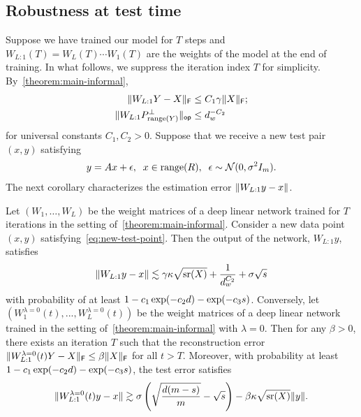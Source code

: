 \subsection{Robustness at test time}
\label{sec:subsec:Robustness at test time}
Suppose we have trained our model for $T$ steps and $W_{L:1}(T) = W_{L}(T) \cdots W_{1}(T)$ are the weights of the model at the end of training.
In what follows, we suppress the iteration index $T$ for simplicity. By~\cref{theorem:main-informal},
\begin{subequations}
\begin{align}
    \lVert W_{L:1}Y-X\rVert_{\mathsf{F}} &\leq
    C_1 \gamma \lVert X\rVert_{\mathsf{F}};
    \label{eq:robust-on} \\
    \lVert W_{L:1} P_{\mathrm{range}(Y)}^{\perp}\rVert_{\mathsf{op}} &\leq
    d_{w}^{-C_2}
    \label{eq:robust-off}
\end{align}
\end{subequations}
for universal constants $C_1, C_2 > 0$. Suppose that we receive a new test pair $(x, y)$ satisfying
\begin{align}
    y=Ax+\epsilon, \;\; x \in \mathrm{range}(R), \;\;
    \epsilon \sim \mathcal{N}(0, \sigma^2 I_{m}).
    \label{eq:new-test-point}
\end{align}
The next corollary characterizes the estimation error $\lVert W_{L:1}y - x\rVert$.
\begin{corollary}
    Let $(W_1, \dots, W_{L})$ be the weight matrices of a deep linear 
    network trained for $T$ iterations in the setting of~\cref{theorem:main-informal}.
    Consider a new data point $(x, y)$ satisfying~\eqref{eq:new-test-point}.
    Then the output of the network, $W_{L:1}y$, satisfies
    \begin{equation}
        \lVert W_{L:1}y - x\rVert \lesssim
        \gamma \kappa \sqrt{\operatorname{\mathrm{sr}}(X)}  + \frac{1}{d_{w}^{C_2}}
        + \sigma \sqrt{s}
    \end{equation}
    with probability of at least $1 - c_1 \exp(-c_2 d) - \exp(-c_3 s)$.
    Conversely, let $(W^{\lambda=0}_1(t),...,W^{\lambda=0}_L(t))$ be the weight matrices of a deep linear network trained in the setting of~\cref{theorem:main-informal} with $\lambda = 0$. Then for any $\beta >0$, there exists an iteration $T$ such that the reconstruction error $\lVert W^{\lambda=0}_{L:1}(t)Y-X\rVert_{\mathsf{F}} \leq \beta \lVert X\rVert_{\mathsf{F}}$ for all $t>T$. Moreover, with probability at least $1 - c_1 \exp(-c_2 d) - \exp(-c_3 s)$, the test error satisfies
    \[
     \lVert W^{\lambda=0}_{L:1}(t)y-x\rVert \gtrsim \sigma \left(
    \sqrt{\frac{d(m - s)}{m}} - \sqrt{s}
    \right) -
    \beta \kappa \sqrt{\operatorname{\mathrm{sr}}(X)} \lVert y\rVert.
    \]
\end{corollary}
